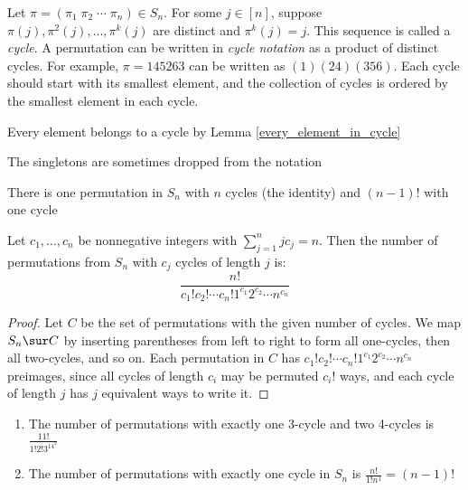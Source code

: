 \documentclass[a4paper]{article}
\begin{document}
\begin{definition}
Let $\pi=(\pi_1\;\pi_2\;\cdots\;\pi_n)\in S_n$. For some $j\in[n]$, suppose $\pi(j),\pi^2(j),\dots,\pi^k(j)$ are distinct and $\pi^k(j)=j$. This sequence is called a \emph{cycle}. A permutation can be written in \emph{cycle notation} as a product of distinct cycles. For example, $\pi=145263$ can be written as $(1)(24)(356)$. Each cycle should start with its smallest element, and the collection of cycles is ordered by the smallest element in each cycle.
\begin{arrows}
\item Every element belongs to a cycle by Lemma \ref{every_element_in_cycle}
\item The singletons are sometimes dropped from the notation
\item There is one permutation in $S_n$ with $n$ cycles (the identity) and $(n-1)!$ with one cycle
\end{arrows}
\end{definition}

\begin{theorem}
Let $c_1,\dots,c_n$ be nonnegative integers with $\sum_{j=1}^njc_j=n$. Then the number of permutations from $S_n$ with $c_j$ cycles of length $j$ is:
\begin{equation*}
\frac{n!}{c_1!c_2!\cdots c_n!1^{c_1}2^{c_2}\cdots n^{c_n}}
\end{equation*}

\begin{hl}
\begin{proof}
Let $C$ be the set of permutations with the given number of cycles. We map $S_n\sur C$ by inserting parentheses from left to right to form all one-cycles, then all two-cycles, and so on. Each permutation in $C$ has $c_1!c_2!\cdots c_n!1^{c_1}2^{c_2}\cdots n^{c_n}$ preimages, since all cycles of length $c_i$ may be permuted $c_i!$ ways, and each cycle of length $j$ has $j$ equivalent ways to write it.
\end{proof}
\end{hl}
\end{theorem}

\begin{example}
\;
\begin{enumerate}
\item The number of permutations with exactly one 3-cycle and two 4-cycles is $\frac{11!}{1!2!3^14^2}$
\item The number of permutations with exactly one cycle in $S_n$ is $\frac{n!}{1!n^1}=(n-1)!$
\end{enumerate}
\end{example}
\end{document}
